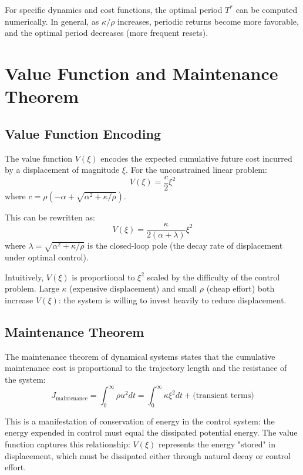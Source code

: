 \documentclass[12pt]{article}
\begin{document}
For specific dynamics and cost functions, the optimal period $T^*$ can be computed numerically. In general, as $\kappa/\rho$ increases, periodic returns become more favorable, and the optimal period decreases (more frequent resets).

\section{Value Function and Maintenance Theorem}

\subsection{Value Function Encoding}

The value function $V(\xi)$ encodes the expected cumulative future cost incurred by a displacement of magnitude $\xi$. For the unconstrained linear problem:
\begin{equation}
V(\xi) = \frac{c}{2} \xi^2
\end{equation}
where $c = \rho \left( -\alpha + \sqrt{\alpha^2 + \kappa/\rho} \right)$.

This can be rewritten as:
\begin{equation}
V(\xi) = \frac{\kappa}{2(\alpha + \lambda)} \xi^2
\end{equation}
where $\lambda = \sqrt{\alpha^2 + \kappa/\rho}$ is the closed-loop pole (the decay rate of displacement under optimal control).

Intuitively, $V(\xi)$ is proportional to $\xi^2$ scaled by the difficulty of the control problem. Large $\kappa$ (expensive displacement) and small $\rho$ (cheap effort) both increase $V(\xi)$: the system is willing to invest heavily to reduce displacement.

\subsection{Maintenance Theorem}

The maintenance theorem of dynamical systems states that the cumulative maintenance cost is proportional to the trajectory length and the resistance of the system:
\begin{equation}
J_{\text{maintenance}} = \int_0^\infty \rho u^2 dt = \int_0^\infty \kappa \xi^2 dt + \text{(transient terms)}
\end{equation}

This is a manifestation of conservation of energy in the control system: the energy expended in control must equal the dissipated potential energy. The value function captures this relationship: $V(\xi)$ represents the energy "stored" in displacement, which must be dissipated either through natural decay or control effort.
\end{document}
